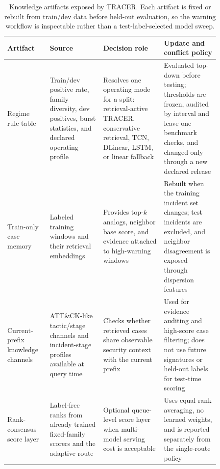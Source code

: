 \begin{table}[t]
\caption{Knowledge artifacts exposed by TRACER. Each artifact is fixed or rebuilt from train/dev data before held-out evaluation, so the warning workflow is inspectable rather than a test-label-selected model sweep.}
\label{tab:knowledge-artifacts}
\centering
\scriptsize
\setlength{\tabcolsep}{3pt}
\begin{tabular}{@{}>{\raggedright\arraybackslash}p{0.16\linewidth}>{\raggedright\arraybackslash}p{0.22\linewidth}>{\raggedright\arraybackslash}p{0.25\linewidth}>{\raggedright\arraybackslash}p{0.23\linewidth}@{}}
\toprule
Artifact & Source & Decision role & Update and conflict policy \\
\midrule
Regime rule table & Train/dev positive rate, family diversity, dev positives, burst statistics, and declared operating profile & Resolves one operating mode for a split: retrieval-active TRACER, conservative retrieval, TCN, DLinear, LSTM, or linear fallback & Evaluated top-down before testing; thresholds are frozen, audited by interval and leave-one-benchmark checks, and changed only through a new declared release \\
Train-only case memory & Labeled training windows and their retrieval embeddings & Provides top-$k$ analogs, neighbor base score, and evidence attached to high-warning windows & Rebuilt when the training incident set changes; test incidents are excluded, and neighbor disagreement is exposed through dispersion features \\
Current-prefix knowledge channels & ATT\&CK-like tactic/stage channels and incident-stage profiles available at query time & Checks whether retrieved cases share observable security context with the current prefix & Used for evidence auditing and high-score case filtering; does not use future signatures or held-out labels for test-time scoring \\
Rank-consensus score layer & Label-free ranks from already trained fixed-family scorers and the adaptive route & Optional queue-level score layer when multi-model serving cost is acceptable & Uses equal rank averaging, no learned weights, and is reported separately from the single-route policy \\
\bottomrule
\end{tabular}
\end{table}

